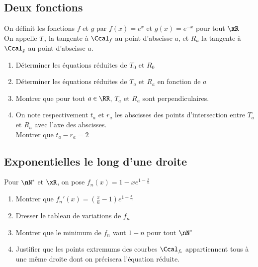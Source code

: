 \documentclass[oneside,12pt]{article}          %
\begin{document}
\subsection{Deux fonctions}
On définit les fonctions $f$ et $g$ par $f(x)=e^x$ et $g(x)=e^{-x}$ pour tout $\xR$\\
On appelle $T_a$ la tangente à $\Ccal_f$ au point d'abscisse $a$, et $R_a$ la tangente à $\Ccal_g$ au point d'abscisse $a$.
\begin{enumerate}
    \item Déterminer les équations réduites de $T_0$ et $R_0$
    \item Déterminer les équations réduites de $T_a$ et $R_a$ en fonction de $a$
    \item Montrer que pour tout $a\in\RR$, $T_a$ et $R_a$ sont perpendiculaires.
    \item On note respectivement $t_a$ et $r_a$ les abscisses des points d'intersection entre $T_a$ et $R_a$ avec l'axe des abscisses.\\
    Montrer que $t_a-r_a=2$
\end{enumerate}



\subsection{Exponentielles le long d'une droite}
Pour $\nN^*$ et $\xR$, on pose $f_n(x)=1-xe^{\left. 1-\frac{x}{n}\right.} $
\begin{enumerate}
    \item Montrer que $f_n'(x)=\left(\frac{x}{n}-1\right)e^{1-\frac{x}{n}}$
    \item Dresser le tableau de variations de $f_n$
    \item Montrer que le minimum de $f_n$ vaut $1-n$ pour tout $\nN^*$
    \item Justifier que les points extremums des courbes $\Ccal_{f_n}$ appartiennent tous à une même droite dont on précisera l'équation réduite.
\end{enumerate}
\end{document}
